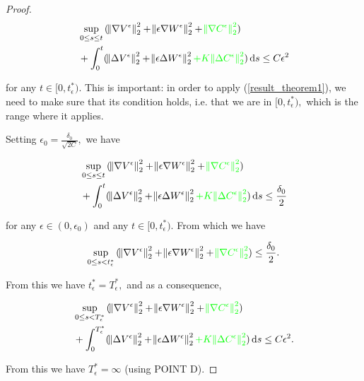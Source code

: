 \documentclass[11pt]{article}
\newcommand*\diff{\mathop{}\!\mathrm{d}}
\begin{document}
\begin{proof}
\begin{equation}
  \begin{split}
    & \sup_{0 \leq s \leq t}{(\norm{\nabla V^\epsilon}^2_2 + \norm{\epsilon \nabla W^\epsilon}^2_2 + \textcolor{green}{\norm{\nabla C^\epsilon}^2_2}) } \\
    & + \int_0^t (\norm{\Delta V^\epsilon}^2_2 + \norm{\epsilon \Delta W^\epsilon}^2_2 \textcolor{green}{+ K \norm{\Delta C^\epsilon}^2_2}) \diff s \leq C \epsilon^2
  \end{split}
\end{equation}

for any $t \in [0, t^*_\epsilon).$ This is important: in order to apply (\ref{result_theorem1}), we need to make sure that its condition holds, i.e. that we are in $[0, t^*_\epsilon),$ which is the range where it applies.

Setting $\epsilon_0 = \frac{\delta_0}{\sqrt{2C}},$ we have

\begin{equation}
  \begin{split}
    & \sup_{0 \leq s \leq t}{(\norm{\nabla V^\epsilon}^2_2 + \norm{\epsilon \nabla W^\epsilon}^2_2 + \textcolor{green}{\norm{\nabla C^\epsilon}^2_2}) } \\
    & + \int_0^t (\norm{\Delta V^\epsilon}^2_2 + \norm{\epsilon \Delta W^\epsilon}^2_2 \textcolor{green}{+ K \norm{\Delta C^\epsilon}^2_2}) \diff s \leq \frac{\delta_0}{2}
  \end{split}
\end{equation}

for any $\epsilon \in (0, \epsilon_0)$ and any $t \in [0, t^*_\epsilon).$ From which we have

$$ \sup_{0 \leq s < t^*_\epsilon}{(\norm{\nabla V^\epsilon}^2_2 + \norm{\epsilon \nabla W^\epsilon}^2_2 + \textcolor{green}{\norm{\nabla C^\epsilon}^2_2}) } \leq \frac{\delta_0}{2}.$$

From this we have $t^*_\epsilon = T^*_\epsilon,$ and as a consequence,

\begin{equation}
  \begin{split}
    & \sup_{0 \leq s < T^*_\epsilon}{(\norm{\nabla V^\epsilon}^2_2 + \norm{\epsilon \nabla W^\epsilon}^2_2 + \textcolor{green}{\norm{\nabla C^\epsilon}^2_2}) } \\
    & + \int_0^{T^*_\epsilon} (\norm{\Delta V^\epsilon}^2_2 + \norm{\epsilon \Delta W^\epsilon}^2_2 \textcolor{green}{+ K \norm{\Delta C^\epsilon}^2_2}) \diff s \leq C \epsilon^2.
  \end{split}
\end{equation}

From this we have $T^*_\epsilon = \infty$ (using POINT D).

\end{proof}
\end{document}
